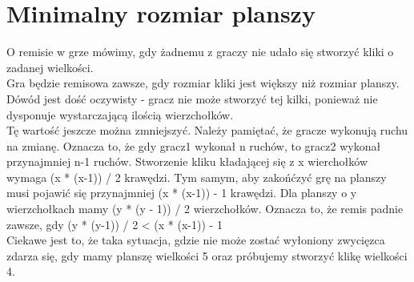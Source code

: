 \documentclass[11pt,a4paper]{article}
\begin{document}
\section{Minimalny rozmiar planszy}
O remisie w grze mówimy, gdy żadnemu z graczy nie udało się stworzyć kliki o zadanej wielkości.\\
Gra będzie remisowa zawsze, gdy rozmiar kliki jest większy niż rozmiar planszy.
Dówód jest dość oczywisty - gracz nie może stworzyć tej kilki, ponieważ nie dysponuje wystarczającą ilością wierzchołków.\\
Tę wartość jeszcze można zmniejszyć.
Należy pamiętać, że gracze wykonują ruchu na zmianę. Oznacza to, że gdy gracz1 wykonał n ruchów, to gracz2 wykonał przynajmniej n-1 ruchów.
Stworzenie kliku kładającej się z x wierchołków wymaga (x * (x-1)) / 2 krawędzi.
Tym samym, aby zakońćzyć grę na planszy musi pojawić się przynajmniej (x * (x-1)) - 1 krawędzi.
Dla planszy o y wierzchołkach mamy (y * (y - 1)) / 2 wierzchołków.
Oznacza to, że remis padnie zawsze, gdy (y * (y-1)) / 2 < (x * (x-1)) - 1\\
Ciekawe jest to, że taka sytuacja, gdzie nie może zostać wyłoniony zwycięzca zdarza się, gdy mamy planszę wielkości 5 oraz próbujemy stworzyć klikę wielkości 4.
\end{document}
